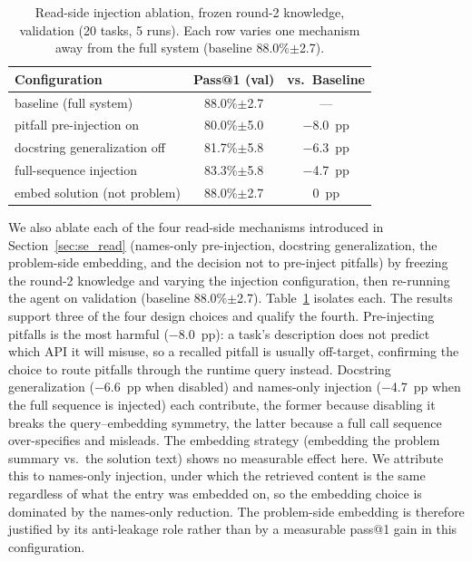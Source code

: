 \documentclass[conference]{IEEEtran}
\begin{document}
\begin{table}[h]
\caption{Read-side injection ablation, frozen round-2 knowledge, validation (20 tasks, 5 runs). Each row varies one mechanism away from the full system (baseline 88.0\%$\pm$2.7).}
\label{tab:se_read_ablation}
\centering
\small
\begin{tabular}{lcc}
\toprule
Configuration & Pass@1 (val) & vs.\ Baseline \\
\midrule
baseline (full system)         & 88.0\%$\pm$2.7 & --- \\
pitfall pre-injection on       & 80.0\%$\pm$5.0 & $-$8.0~pp \\
docstring generalization off   & 81.7\%$\pm$5.8 & $-$6.3~pp \\
full-sequence injection        & 83.3\%$\pm$5.8 & $-$4.7~pp \\
embed solution (not problem)   & 88.0\%$\pm$2.7 & 0~pp \\
\bottomrule
\end{tabular}
\end{table}

We also ablate each of the four read-side mechanisms introduced in Section~\ref{sec:se_read} (names-only pre-injection, docstring generalization, the problem-side embedding, and the decision not to pre-inject pitfalls) by freezing the round-2 knowledge and
varying the injection configuration, then re-running the agent on validation (baseline 88.0\%$\pm$2.7). Table~\ref{tab:se_read_ablation} isolates each. The results support three of the four design choices and qualify the
fourth. Pre-injecting pitfalls is the most harmful ($-$8.0~pp): a task's description does not predict which API it will misuse, so a recalled pitfall is usually off-target, confirming the choice to route pitfalls through the runtime query instead. Docstring generalization ($-$6.6~pp when disabled) and names-only injection ($-$4.7~pp when the full sequence is injected) each contribute, the former because disabling it breaks the query--embedding symmetry, the latter because a full call sequence over-specifies and misleads. The embedding strategy (embedding the problem summary vs.\ the solution text) shows no measurable effect here. We attribute this to names-only injection, under which the retrieved content is the same regardless of what the entry was embedded on, so the embedding choice is dominated by the names-only
reduction. The problem-side embedding is therefore justified by its anti-leakage role rather than by a measurable pass@1 gain in this configuration.
\end{document}
